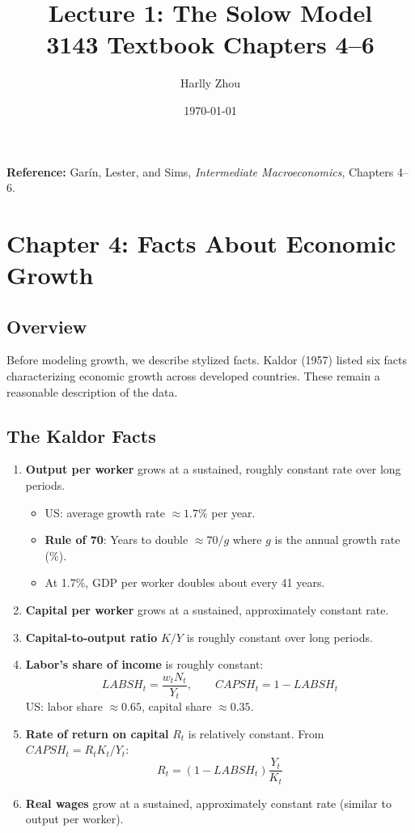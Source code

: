 \documentclass[12pt]{article}
\title{Lecture 1: The Solow Model\\
\large 3143 Textbook Chapters 4--6}
\author{Harlly Zhou}
\date{\today}
\begin{document}
\maketitle

\noindent\textbf{Reference:} Garín, Lester, and Sims, \textit{Intermediate Macroeconomics}, Chapters 4--6.

\tableofcontents
\newpage

\section{Chapter 4: Facts About Economic Growth}

\subsection{Overview}
Before modeling growth, we describe stylized facts. Kaldor (1957) listed six facts characterizing economic growth across developed countries. These remain a reasonable description of the data.

\subsection{The Kaldor Facts}
\begin{enumerate}
    \item \textbf{Output per worker} grows at a sustained, roughly constant rate over long periods.
    \begin{itemize}
        \item US: average growth rate $\approx 1.7\%$ per year.
        \item \textbf{Rule of 70}: Years to double $\approx 70 / g$ where $g$ is the annual growth rate (\%).
        \item At 1.7\%, GDP per worker doubles about every 41 years.
    \end{itemize}
    
    \item \textbf{Capital per worker} grows at a sustained, approximately constant rate.
    \item \textbf{Capital-to-output ratio} $K/Y$ is roughly constant over long periods.
    \item \textbf{Labor's share of income} is roughly constant:
    \[
        LABSH_t = \frac{w_t N_t}{Y_t}, \qquad CAPSH_t = 1 - LABSH_t
    \]
    US: labor share $\approx 0.65$, capital share $\approx 0.35$.
    \item \textbf{Rate of return on capital} $R_t$ is relatively constant. From $CAPSH_t = R_t K_t / Y_t$:
    \[
        R_t = (1 - LABSH_t) \frac{Y_t}{K_t}
    \]
    \item \textbf{Real wages} grow at a sustained, approximately constant rate (similar to output per worker).
\end{enumerate}
\end{document}
